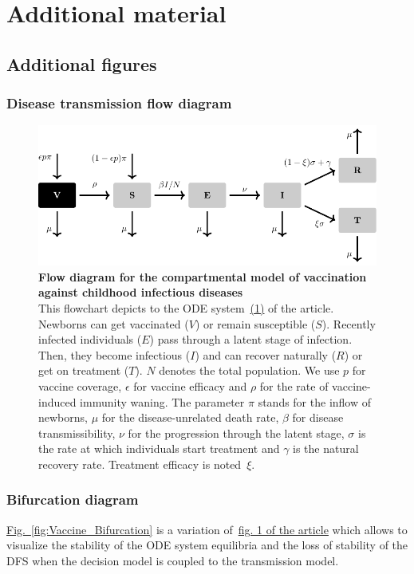 \section{Additional material}
\label{Vaccine:Appendix}
\subsection{Additional figures}

\subsubsection*{Disease transmission flow diagram}
\begin{figure}[H]
	\centering
	\includegraphics[width=0.8\linewidth]{Figures/Vaccine/Tikz_FlowDiagram/FlowDiagram}
	\caption[Flow diagram for the compartmental model of vaccination against childhood infectious diseases]{%
	       {\bf Flow diagram for the compartmental model of vaccination against childhood infectious diseases}\\
	This flowchart depicts to the ODE system~\hyperlink{Article1.2}{(1)} of the article. Newborns can get vaccinated ($V$) or remain susceptible ($S$). Recently infected individuals ($E$) pass through a latent stage of infection. Then, they become infectious ($I$) and can recover naturally ($R$) or get on treatment ($T$). $N$ denotes the total population. We use $p$ for vaccine coverage, $\epsilon$ for vaccine efficacy and $\rho$ for the rate of vaccine-induced immunity waning. The parameter $\pi$  stands for the inflow of newborns, $\mu$ for the disease-unrelated death rate, $\beta$ for disease transmissibility, $\nu$ for the progression through the latent stage, $\sigma$ is the rate at which individuals start treatment and $\gamma$ is the natural recovery rate. Treatment efficacy is noted~$\xi$.
}
	\label{fig:Vaccine_FlowDiag}
\end{figure}

\newpage
\subsubsection*{Bifurcation diagram}
\hyperlink{fig:Vaccine_Bifurcation}{Fig.~\ref*{fig:Vaccine_Bifurcation}} is a variation of~\hyperlink{fig:Vaccine_1}{fig. 1 of the article} which allows to visualize the stability of the ODE system equilibria and the loss of stability of the DFS when the decision model is coupled to the transmission model.

